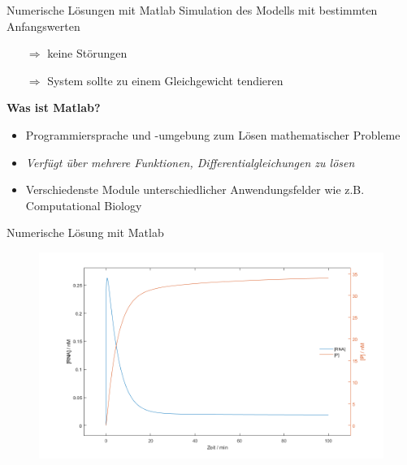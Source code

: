 \documentclass[11pt,aspectratio=169,reqno]{beamer}
\begin{document}
\begin{frame}{Numerische Lösungen mit Matlab}
    Simulation des Modells mit bestimmten Anfangswerten
    \begin{itemize}
        \item[$\Rightarrow$] keine Störungen
        \item[$\Rightarrow$] System sollte zu einem Gleichgewicht tendieren
    \end{itemize}

    \vspace{4em}
    \textbf{Was ist Matlab?}\\
    \begin{itemize}
        \item Programmiersprache und -umgebung zum Lösen mathematischer Probleme
        \item \emph{Verfügt über mehrere Funktionen, Differentialgleichungen zu lösen}
        \item Verschiedenste Module unterschiedlicher Anwendungsfelder wie z.B. Computational Biology
    \end{itemize}
\end{frame}

\begin{frame}{Numerische Lösung mit Matlab\hfill {\small \color[ETHBblue]{Negative Autoregulation}}}
\begin{figure}
    \centering
    \includegraphics[width=.7\textwidth]{images/simulations/negative_autoregulation_basic.m.png}
\end{figure}
\end{frame}
\end{document}
